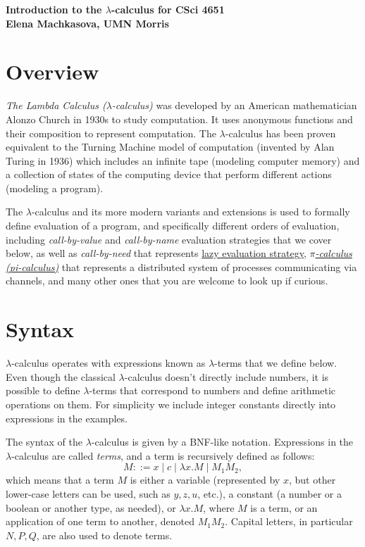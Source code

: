 \documentclass{article}
\newcommand{\lam}{\lambda}
\begin{document}



\begin{center}
{\large\bf Introduction to the $\lam$-calculus for CSci 4651}
\\ 
{\large\bf Elena Machkasova, UMN Morris}
\end{center}

\section{Overview}
\textit{The Lambda Calculus ($\lam$-calculus)} was developed by an American mathematician Alonzo Church in 1930s to study computation. 
It uses anonymous functions and their composition to represent computation. The $\lam$-calculus has been proven equivalent to 
the Turning Machine model of computation (invented by Alan Turing in 1936) which includes an infinite tape (modeling computer memory) and a collection of states of the computing device that perform different actions (modeling a program). 

The $\lam$-calculus and its more modern variants and extensions is used to formally define evaluation of a program, and 
specifically different orders of evaluation, including \textit{call-by-value} and \textit{call-by-name} evaluation strategies that we cover below, 
as well as \textit{call-by-need} that represents \href{https://en.wikipedia.org/wiki/Lazy_evaluation}{lazy evaluation strategy}, 
\href{https://en.wikipedia.org/wiki/\%CE\%A0-calculus}{\textit{$\pi$-calculus (pi-calculus)}} that represents a distributed system of processes communicating via channels, and many other ones that you are welcome to look up if curious. 

\section{Syntax}

$\lam$-calculus operates with expressions known as $\lam$-terms that we define below. 
Even though the classical $\lam$-calculus doesn't directly include numbers, it is possible to define $\lam$-terms 
that correspond to numbers and define
arithmetic operations on them. For simplicity we include integer constants directly into expressions in the examples. 

The syntax of the $\lam$-calculus is given by a BNF-like notation. Expressions in the $\lam$-calculus are called \textit{terms}, 
and a term is recursively defined as follows:
$$
M ::= x \mid c \mid \lam x. M \mid M_1 M_2,
$$
which means that a term $M$ is either a variable (represented by $x$, but other lower-case letters can be used, such as $y,z,u$, etc.), a constant (a number or a boolean or another type, as needed), or $\lam x. M$, where $M$ is a term, or an application of one term to another, denoted $M_1 M_2$. Capital letters, in particular $N, P, Q$, are also used to denote terms. 
\end{document}
